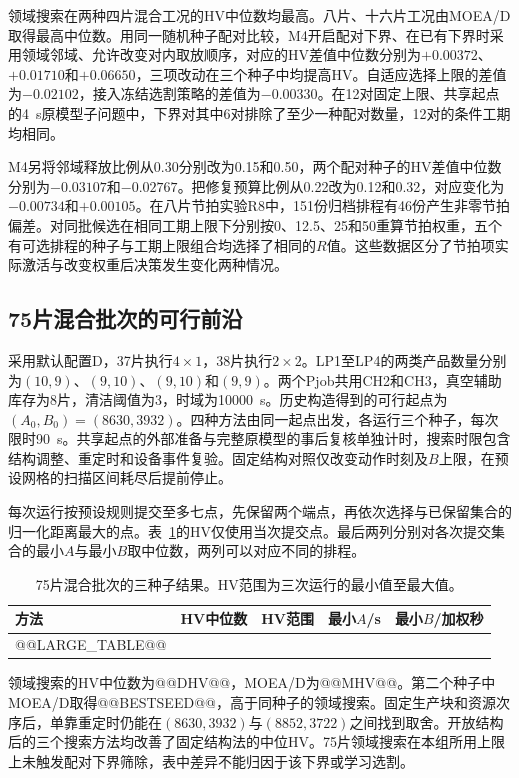 领域搜索在两种四片混合工况的HV中位数均最高。八片、十六片工况由MOEA/D取得最高中位数。用同一随机种子配对比较，M4开启配对下界、在已有下界时采用领域邻域、允许改变对内取放顺序，对应的HV差值中位数分别为$+0.00372$、$+0.01710$和$+0.06650$，三项改动在三个种子中均提高HV。自适应选择上限的差值为$-0.02102$，接入冻结选割策略的差值为$-0.00330$。在12对固定上限、共享起点的4~s原模型子问题中，下界对其中6对排除了至少一种配对数量，12对的条件工期均相同。

M4另将邻域释放比例从0.30分别改为0.15和0.50，两个配对种子的HV差值中位数分别为$-0.03107$和$-0.02767$。把修复预算比例从0.22改为0.12和0.32，对应变化为$-0.00734$和$+0.00105$。在八片节拍实验R8中，151份归档排程有46份产生非零节拍偏差。对同批候选在相同工期上限下分别按0、12.5、25和50重算节拍权重，五个有可选排程的种子与工期上限组合均选择了相同的$R$值。这些数据区分了节拍项实际激活与改变权重后决策发生变化两种情况。

\subsection{75片混合批次的可行前沿}

采用默认配置D，37片执行$4\times1$，38片执行$2\times2$。LP1至LP4的两类产品数量分别为$(10,9)$、$(9,10)$、$(9,10)$和$(9,9)$。两个Pjob共用CH2和CH3，真空辅助库存为8片，清洁阈值为3，时域为10000~s。历史构造得到的可行起点为$(A_0,B_0)=(8630,3932)$。四种方法由同一起点出发，各运行三个种子，每次限时90~s。共享起点的外部准备与完整原模型的事后复核单独计时，搜索时限包含结构调整、重定时和设备事件复验。固定结构对照仅改变动作时刻及$B$上限，在预设网格的扫描区间耗尽后提前停止。

每次运行按预设规则提交至多七点，先保留两个端点，再依次选择与已保留集合的归一化距离最大的点。表~\ref{tab:pareto75}的HV仅使用当次提交点。最后两列分别对各次提交集合的最小$A$与最小$B$取中位数，两列可以对应不同的排程。
\begin{table}[!htbp]\centering\small
\caption{75片混合批次的三种子结果。HV范围为三次运行的最小值至最大值。}\label{tab:pareto75}
\begin{tabular}{lrrrr}\toprule
方法 & HV中位数 & HV范围 & 最小$A$/s & 最小$B$/加权秒 \\\midrule
@@LARGE_TABLE@@
\bottomrule\end{tabular}
\end{table}

领域搜索的HV中位数为@@DHV@@，MOEA/D为@@MHV@@。第二个种子中MOEA/D取得@@BESTSEED@@，高于同种子的领域搜索。固定生产块和资源次序后，单靠重定时仍能在$(8630,3932)$与$(8852,3722)$之间找到取舍。开放结构后的三个搜索方法均改善了固定结构法的中位HV。75片领域搜索在本组所用上限上未触发配对下界筛除，表中差异不能归因于该下界或学习选割。

